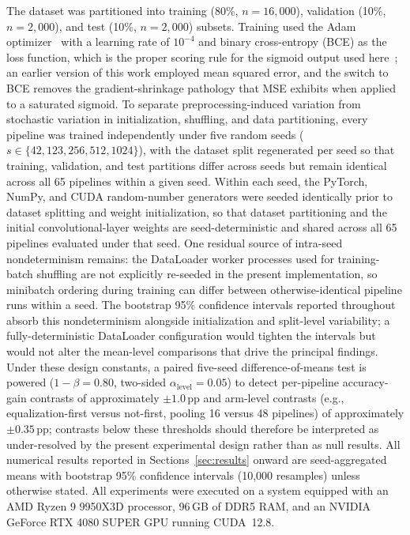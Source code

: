\documentclass[preprint,5p,times,twocolumn]{elsarticle}
\begin{document}
The dataset was partitioned into training (80\%, $n = 16{,}000$), validation (10\%, $n = 2{,}000$), and test (10\%, $n = 2{,}000$) subsets. Training used the Adam optimizer~\cite{KingmaBa2015} with a learning rate of $10^{-4}$ and binary cross-entropy (BCE) as the loss function, which is the proper scoring rule for the sigmoid output used here~\cite{Good1952}; an earlier version of this work employed mean squared error, and the switch to BCE removes the gradient-shrinkage pathology that MSE exhibits when applied to a saturated sigmoid. To separate preprocessing-induced variation from stochastic variation in initialization, shuffling, and data partitioning, every pipeline was trained independently under five random seeds ($s \in \{42, 123, 256, 512, 1024\}$), with the dataset split regenerated per seed so that training, validation, and test partitions differ across seeds but remain identical across all 65 pipelines within a given seed. Within each seed, the PyTorch, NumPy, and CUDA random-number generators were seeded identically prior to dataset splitting and weight initialization, so that dataset partitioning and the initial convolutional-layer weights are seed-deterministic and shared across all 65 pipelines evaluated under that seed. One residual source of intra-seed nondeterminism remains: the DataLoader worker processes used for training-batch shuffling are not explicitly re-seeded in the present implementation, so minibatch ordering during training can differ between otherwise-identical pipeline runs within a seed. The bootstrap 95\% confidence intervals reported throughout absorb this nondeterminism alongside initialization and split-level variability; a fully-deterministic DataLoader configuration would tighten the intervals but would not alter the mean-level comparisons that drive the principal findings. Under these design constants, a paired five-seed difference-of-means test is powered ($1 - \beta = 0.80$, two-sided $\alpha_{\text{level}} = 0.05$) to detect per-pipeline accuracy-gain contrasts of approximately $\pm 1.0$\,pp and arm-level contrasts (e.g., equalization-first versus not-first, pooling 16 versus 48 pipelines) of approximately $\pm 0.35$\,pp; contrasts below these thresholds should therefore be interpreted as under-resolved by the present experimental design rather than as null results. All numerical results reported in Sections~\ref{sec:results} onward are seed-aggregated means with bootstrap 95\% confidence intervals (10{,}000 resamples) unless otherwise stated. All experiments were executed on a system equipped with an AMD Ryzen 9 9950X3D processor, 96\,GB of DDR5 RAM, and an NVIDIA GeForce RTX 4080 SUPER GPU running CUDA~12.8.
\end{document}
